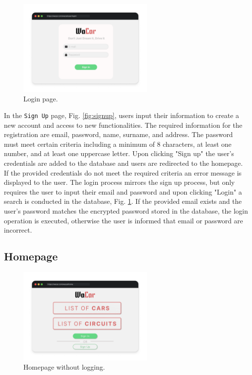 \begin{figure}[h]
    \centering
    \includegraphics[width=0.6\textwidth]{mockup/Sign in.png}
    \caption{Login page.}
    \label{fig:signin}
\end{figure}

In the \texttt{Sign Up} page, Fig. \ref{fig:signup}, users input their information to create a new account and access to new functionalities. The required information for the registration are email, password, name, surname, and address. The password must meet certain criteria including a minimum of 8 characters, at least one number, and at least one uppercase letter. Upon clicking "Sign up" the user's credentials are added to the database and users are redirected to the homepage. If the provided credentials do not meet the required criteria an error message is displayed to the user. The login process mirrors the sign up process, but only requires the user to input their email and password and upon clicking "Login" a search is conducted in the database, Fig. \ref{fig:signin}. If the provided email exists and the user's password matches the encrypted password stored in the database, the login operation is executed, otherwise the user is informed that email or password are incorrect.

\subsection{Homepage}

\begin{figure}[h]
    \centering
    \includegraphics[width=0.6\textwidth]{mockup/NoLogHome.png}
    \caption{Homepage without logging.}
    \label{fig:nologhome}
\end{figure}

